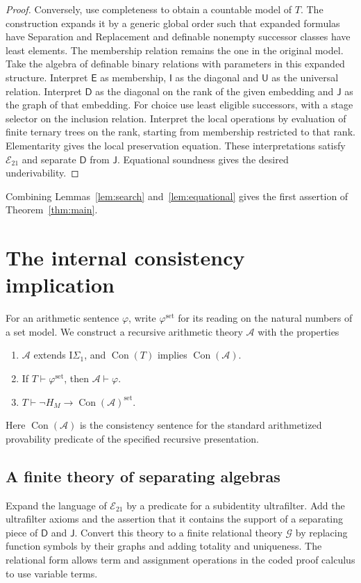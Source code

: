 \documentclass[11pt,letterpaper]{article}
\newcommand{\Con}{\operatorname{Con}}
\newcommand{\A}{\mathcal A}
\newcommand{\G}{\mathcal G}
\newcommand{\D}{\mathsf D}
\newcommand{\J}{\mathsf J}
\newcommand{\E}{\mathsf E}
\newcommand{\U}{\mathsf U}
\newcommand{\I}{\mathsf I}
\begin{document}
\begin{proof}
Conversely, use completeness to obtain a countable model of $T$.
The construction expands it by a generic global order such that
expanded formulas have Separation and Replacement and definable
nonempty successor classes have least elements. The membership
relation remains the one in the original model. Take the algebra of
definable binary relations with parameters in this expanded
structure. Interpret $\E$ as membership, $\I$ as the diagonal and
$\U$ as the universal relation. Interpret $\D$ as the diagonal on the
rank of the given embedding and $\J$ as the graph of that embedding.
For choice use least eligible successors, with a stage selector on
the inclusion relation. Interpret the local operations by evaluation
of finite ternary trees on the rank, starting from membership
restricted to that rank. Elementarity gives the local preservation
equation. These interpretations satisfy $\mathcal E_{21}$ and
separate $\D$ from $\J$. Equational soundness gives the desired
underivability.
\end{proof}

Combining Lemmas~\ref{lem:search} and~\ref{lem:equational} gives the
first assertion of Theorem~\ref{thm:main}.

\section{The internal consistency implication}\label{sec:internal}

For an arithmetic sentence $\varphi$, write $\varphi^{\mathrm{set}}$
for its reading on the natural numbers of a set model. We construct
a recursive arithmetic theory $\A$ with the properties
\begin{enumerate}
\item $\A$ extends $\mathrm I\Sigma_1$, and $\Con(T)$ implies $\Con(\A)$.
\item If $T\vdash\varphi^{\mathrm{set}}$, then $\A\vdash\varphi$.
\item $T\vdash\neg H_M\to\Con(\A)^{\mathrm{set}}$.
\end{enumerate}
Here $\Con(\A)$ is the consistency sentence for the standard
arithmetized provability predicate of the specified recursive
presentation.

\subsection{A finite theory of separating algebras}

Expand the language of $\mathcal E_{21}$ by a predicate for a
subidentity ultrafilter. Add the ultrafilter axioms and the assertion
that it contains the support of a separating piece of $\D$ and $\J$.
Convert this theory to a finite relational theory $\G$ by replacing
function symbols by their graphs and adding totality and uniqueness.
The relational form allows term and assignment operations in the
coded proof calculus to use variable terms.
\end{document}
